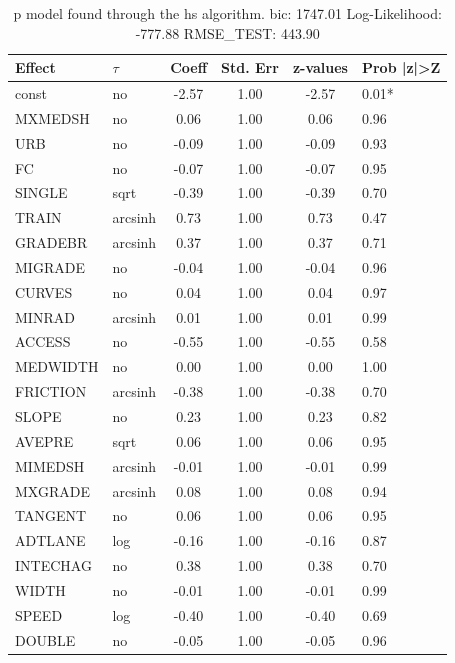 \begin{table}
	\caption{p model found through the hs algorithm. bic: 1747.01 Log-Likelihood: -777.88 RMSE_TEST: 443.90}
	\begin{center}
		\begin{tabular}{|l|l|c|c|c|l|}
			\hline
			Effect & $\tau$ & Coeff & Std. Err & z-values & Prob |z|>Z \\
			\hline
			const & no & -2.57 & 1.00 & -2.57 & 0.01* \\
			\hline
			MXMEDSH & no & 0.06 & 1.00 & 0.06 & 0.96 \\
			\hline
			URB & no & -0.09 & 1.00 & -0.09 & 0.93 \\
			\hline
			FC & no & -0.07 & 1.00 & -0.07 & 0.95 \\
			\hline
			SINGLE & sqrt & -0.39 & 1.00 & -0.39 & 0.70 \\
			\hline
			TRAIN & arcsinh & 0.73 & 1.00 & 0.73 & 0.47 \\
			\hline
			GRADEBR & arcsinh & 0.37 & 1.00 & 0.37 & 0.71 \\
			\hline
			MIGRADE & no & -0.04 & 1.00 & -0.04 & 0.96 \\
			\hline
			CURVES & no & 0.04 & 1.00 & 0.04 & 0.97 \\
			\hline
			MINRAD & arcsinh & 0.01 & 1.00 & 0.01 & 0.99 \\
			\hline
			ACCESS & no & -0.55 & 1.00 & -0.55 & 0.58 \\
			\hline
			MEDWIDTH & no & 0.00 & 1.00 & 0.00 & 1.00 \\
			\hline
			FRICTION & arcsinh & -0.38 & 1.00 & -0.38 & 0.70 \\
			\hline
			SLOPE & no & 0.23 & 1.00 & 0.23 & 0.82 \\
			\hline
			AVEPRE & sqrt & 0.06 & 1.00 & 0.06 & 0.95 \\
			\hline
			MIMEDSH & arcsinh & -0.01 & 1.00 & -0.01 & 0.99 \\
			\hline
			MXGRADE & arcsinh & 0.08 & 1.00 & 0.08 & 0.94 \\
			\hline
			TANGENT & no & 0.06 & 1.00 & 0.06 & 0.95 \\
			\hline
			ADTLANE & log & -0.16 & 1.00 & -0.16 & 0.87 \\
			\hline
			INTECHAG & no & 0.38 & 1.00 & 0.38 & 0.70 \\
			\hline
			WIDTH & no & -0.01 & 1.00 & -0.01 & 0.99 \\
			\hline
			SPEED & log & -0.40 & 1.00 & -0.40 & 0.69 \\
			\hline
			DOUBLE & no & -0.05 & 1.00 & -0.05 & 0.96 \\

\end{tabular}
\end{center}
\end{table}
